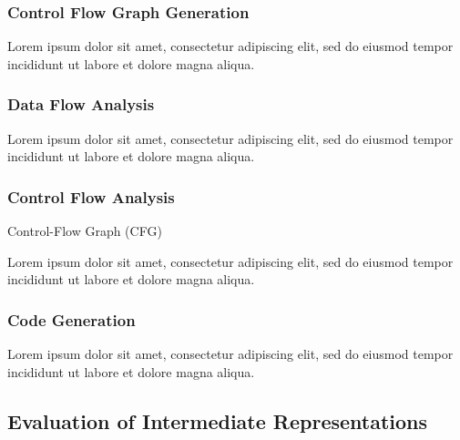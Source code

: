 \documentclass[12pt, a4paper]{article}
\begin{document}

\subsubsection{Control Flow Graph Generation}

Lorem ipsum dolor sit amet, consectetur adipiscing elit, sed do eiusmod tempor incididunt ut labore et dolore magna aliqua.


\subsubsection{Data Flow Analysis}

Lorem ipsum dolor sit amet, consectetur adipiscing elit, sed do eiusmod tempor incididunt ut labore et dolore magna aliqua.

\cite{type_decomp}


\subsubsection{Control Flow Analysis}

Control-Flow Graph (CFG)

Lorem ipsum dolor sit amet, consectetur adipiscing elit, sed do eiusmod tempor incididunt ut labore et dolore magna aliqua.


\subsubsection{Code Generation}

Lorem ipsum dolor sit amet, consectetur adipiscing elit, sed do eiusmod tempor incididunt ut labore et dolore magna aliqua.


\subsection{Evaluation of Intermediate Representations}
\end{document}
